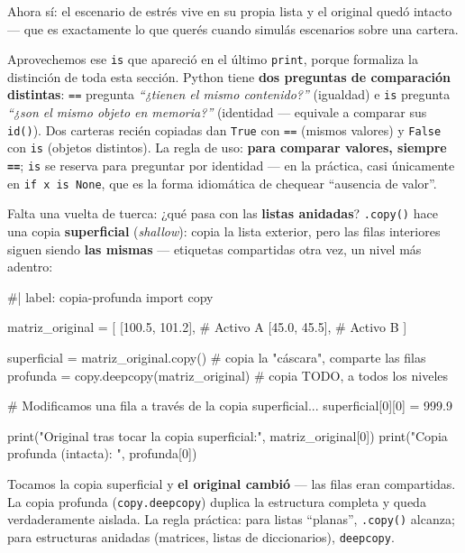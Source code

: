 \documentclass[
  spanish,
  letterpaper,
  DIV=11,
  numbers=noendperiod]{scrreprt}
\newenvironment{Shaded}{\begin{snugshade}}{\end{snugshade}}
\newcommand{\NormalTok}[1]{\textcolor[rgb]{0.00,0.23,0.31}{#1}}
\begin{document}
Ahora sí: el escenario de estrés vive en su propia lista y el original
quedó intacto --- que es exactamente lo que querés cuando simulás
escenarios sobre una cartera.

Aprovechemos ese \texttt{is} que apareció en el último \texttt{print},
porque formaliza la distinción de toda esta sección. Python tiene
\textbf{dos preguntas de comparación distintas}: \texttt{==} pregunta
\emph{``¿tienen el mismo contenido?''} (igualdad) e \texttt{is} pregunta
\emph{``¿son el mismo objeto en memoria?''} (identidad --- equivale a
comparar sus \texttt{id()}). Dos carteras recién copiadas dan
\texttt{True} con \texttt{==} (mismos valores) y \texttt{False} con
\texttt{is} (objetos distintos). La regla de uso: \textbf{para comparar
valores, siempre \texttt{==}}; \texttt{is} se reserva para preguntar por
identidad --- en la práctica, casi únicamente en
\texttt{if\ x\ is\ None}, que es la forma idiomática de chequear
``ausencia de valor''.

Falta una vuelta de tuerca: ¿qué pasa con las \textbf{listas anidadas}?
\texttt{.copy()} hace una copia \textbf{superficial} (\emph{shallow}):
copia la lista exterior, pero las filas interiores siguen siendo
\textbf{las mismas} --- etiquetas compartidas otra vez, un nivel más
adentro:

\begin{Shaded}
\begin{Highlighting}[]
\NormalTok{\#| label: copia{-}profunda}
\NormalTok{import copy}

\NormalTok{matriz\_original = [}
\NormalTok{    [100.5, 101.2],   \# Activo A}
\NormalTok{    [45.0, 45.5],     \# Activo B}
\NormalTok{]}

\NormalTok{superficial = matriz\_original.copy()       \# copia la "cáscara", comparte las filas}
\NormalTok{profunda = copy.deepcopy(matriz\_original)  \# copia TODO, a todos los niveles}

\NormalTok{\# Modificamos una fila a través de la copia superficial...}
\NormalTok{superficial[0][0] = 999.9}

\NormalTok{print("Original tras tocar la copia superficial:", matriz\_original[0])}
\NormalTok{print("Copia profunda (intacta):                ", profunda[0])}
\end{Highlighting}
\end{Shaded}

Tocamos la copia superficial y \textbf{el original cambió} --- las filas
eran compartidas. La copia profunda (\texttt{copy.deepcopy}) duplica la
estructura completa y queda verdaderamente aislada. La regla práctica:
para listas ``planas'', \texttt{.copy()} alcanza; para estructuras
anidadas (matrices, listas de diccionarios), \texttt{deepcopy}.
\end{document}

